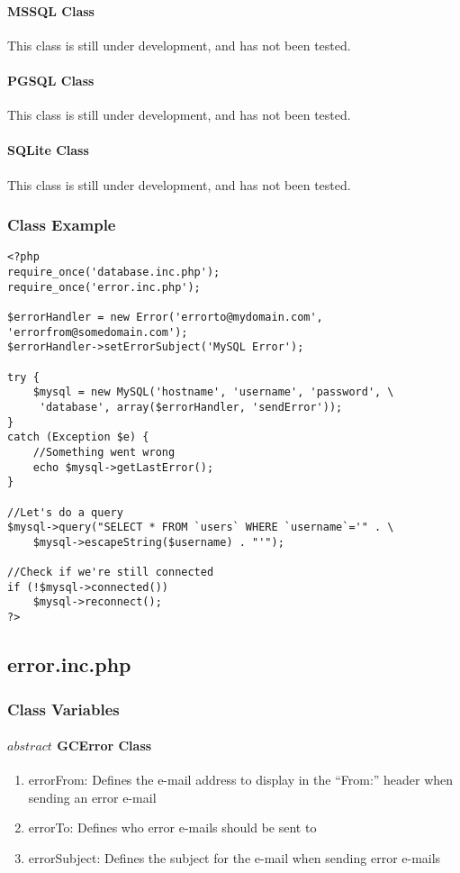 \documentclass{article}
\begin{document}
\paragraph{MSSQL Class}
This class is still under development, and has not been tested.

\paragraph{PGSQL Class}
This class is still under development, and has not been tested.

\paragraph{SQLite Class}
This class is still under development, and has not been tested.

\newpage

\subsubsection{Class Example}
\begin{lstlisting}
<?php
require_once('database.inc.php');
require_once('error.inc.php');

$errorHandler = new Error('errorto@mydomain.com', 'errorfrom@somedomain.com');
$errorHandler->setErrorSubject('MySQL Error');

try {
	$mysql = new MySQL('hostname', 'username', 'password', \ 
	 'database', array($errorHandler, 'sendError'));
}
catch (Exception $e) {
	//Something went wrong
	echo $mysql->getLastError();
}

//Let's do a query
$mysql->query("SELECT * FROM `users` WHERE `username`='" . \ 
	$mysql->escapeString($username) . "'");

//Check if we're still connected
if (!$mysql->connected())
	$mysql->reconnect();
?>
\end{lstlisting}

\newpage

\subsection{error.inc.php}
\subsubsection{Class Variables}
\paragraph{\(abstract\) GCError Class}
\begin{enumerate}
\item errorFrom: Defines the e-mail address to display in the “From:” header when sending an error e-mail
\item errorTo: Defines who error e-mails should be sent to
\item errorSubject: Defines the subject for the e-mail when sending error e-mails
\end{enumerate}
\end{document}
